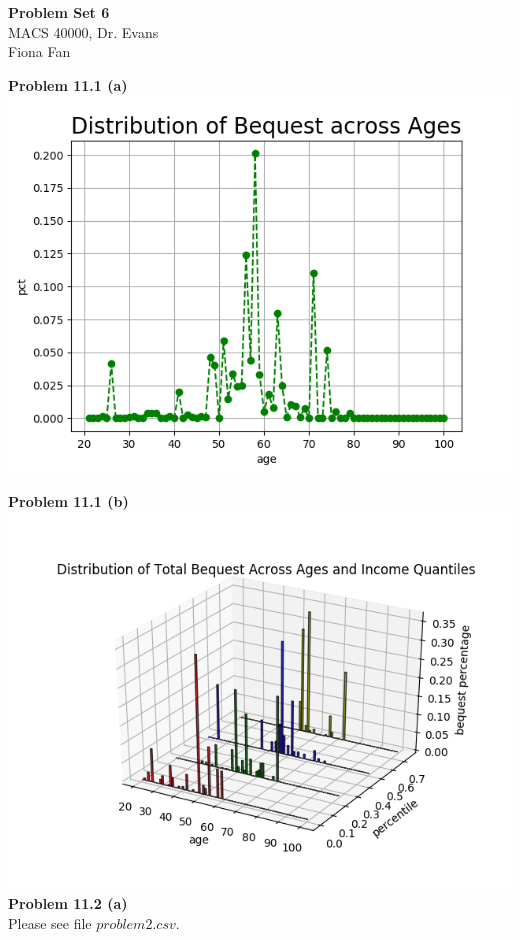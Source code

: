\documentclass[letterpaper,12pt]{article}
\theoremstyle{definition}
\begin{document}
\begin{flushleft}
  \textbf{\large{Problem Set 6}} \\
  MACS 40000, Dr. Evans \\
  Fiona Fan
\end{flushleft}

\vspace{5mm}

\noindent\textbf{Problem 11.1 (a)}\\
\includegraphics[scale=0.5]{images/distribution.png}


\noindent\textbf{Problem 11.1 (b)}\\
\includegraphics[scale=0.5]{images/bq_pct_quantile.png}
\\
\noindent\textbf{Problem 11.2 (a)}\\
Please see file $problem2.csv$. 
\end{document}
